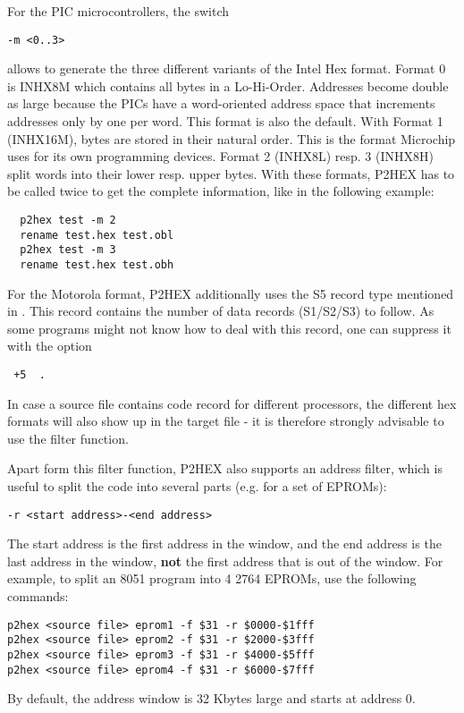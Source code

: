 \documentclass[12pt,twoside]{report}
\newcommand{\bb}[1]{{\bf #1}}
\begin{document}
For the PIC microcontrollers, the switch
\begin{verbatim}
-m <0..3>
\end{verbatim}
allows to generate the three different variants of the Intel Hex
format.  Format 0 is INHX8M which contains all bytes in a
Lo-Hi-Order.  Addresses become double as large because the PICs have
a word-oriented address space that increments addresses only by one
per word.  This format is also the default.  With Format 1 (INHX16M),
bytes are stored in their natural order.  This is the format
Microchip uses for its own programming devices.  Format 2 (INHX8L)
resp. 3 (INHX8H) split words into their lower resp. upper bytes. 
With these formats, P2HEX has to be called twice to get the complete
information, like in the following example:
\begin{verbatim}
  p2hex test -m 2
  rename test.hex test.obl
  p2hex test -m 3
  rename test.hex test.obh
\end{verbatim}
For the Motorola format, P2HEX additionally uses the S5 record type
mentioned in \cite{CPM68K}.  This record contains the number of data
records (S1/S2/S3) to follow.  As some programs might not know how to
deal with this record, one can suppress it with the option
\begin{verbatim}
 +5  .
\end{verbatim}
In case a source file contains code record for different processors,
the different hex formats will also show up in the target file - it
is therefore strongly advisable to use the filter function.

Apart form this filter function, P2HEX also supports an address
filter, which is useful to split the code into several parts (e.g.
for a set of EPROMs):
\begin{verbatim}
-r <start address>-<end address>
\end{verbatim}
The start address is the first address in the window, and the end
address is the last address in the window, \bb{not} the first address
that is out of the window.  For example, to split an 8051 program
into 4 2764 EPROMs, use the following commands:
\begin{verbatim}
p2hex <source file> eprom1 -f $31 -r $0000-$1fff
p2hex <source file> eprom2 -f $31 -r $2000-$3fff 
p2hex <source file> eprom3 -f $31 -r $4000-$5fff 
p2hex <source file> eprom4 -f $31 -r $6000-$7fff 
\end{verbatim}
By default, the address window is 32 Kbytes large and starts at
address 0.  
\end{document}
